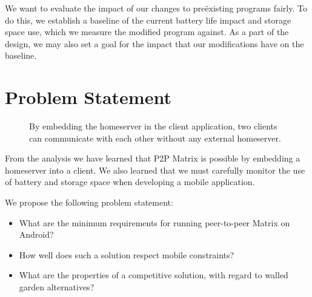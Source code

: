 We want to evaluate the impact of our changes to preëxisting programs fairly.
To do this, we establish a baseline of the current battery life impact and storage space use, which we measure the modified program against.
As a part of the design, we may also set a goal for the impact that our modifications have on the baseline.

\section{Problem Statement}\label{sec:problem_statement}

\begin{figure}
	\centering
	\resizebox{!}{!}{}
	\caption{
		By embedding the homeserver in the client application, two clients can communicate with each other without any external homeserver.
	}%
	\label{fig:p2p-embed}
\end{figure}
From the analysis we have learned that \ac{P2P} Matrix is possible by embedding a homeserver into a client.
We also learned that we must carefully monitor the use of battery and storage space when developing a mobile application.

We propose the following problem statement:\\
\begin{itemize}
	\item What are the minimum requirements for running peer-to-peer Matrix on Android?
	\item How well does such a solution respect mobile constraints?
	\item What are the properties of a competitive solution, with regard to walled garden alternatives?
\end{itemize}